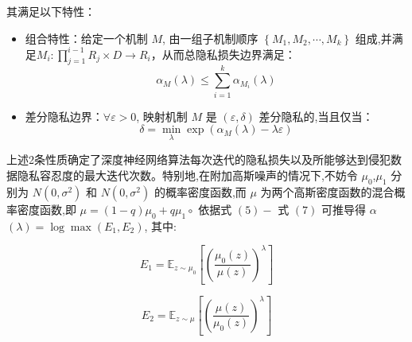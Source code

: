 其满足以下特性：

\begin{itemize}
\item 组合特性：给定一个机制 $M$, 由一组子机制顺序 $\left\{M_{1}, M_{2}, \cdots, M_{k}\right\}$ 组成,并满足$M_{i}: \prod_{j=1}^{i-1} R_{j} \times D \rightarrow R_{i}$，从而总隐私损失边界满足：
$$
\alpha_{M}(\lambda) \leqslant \sum_{i=1}^{k} \alpha_{M_{i}}(\lambda)
$$

\item 差分隐私边界：$\forall \varepsilon>0$, 映射机制 $M$ 是 $(\varepsilon, \delta)$ 差分隐私的,当且仅当：
$$
\delta=\min _{\lambda} \exp \left(\alpha_{M}(\lambda)-\lambda \varepsilon\right)
$$
\end{itemize}

上述2条性质确定了深度神经网络算法每次迭代的隐私损失以及所能够达到侵犯数据隐私容忍度的最大迭代次数。特别地,在附加高斯噪声的情况下,不妨令 $\mu_{0}$,$\mu_{1}$ 分别为 $N\left(0, \sigma^{2}\right)$ 和 $N\left(0, \sigma^{2}\right)$ 的概率密度函数,而 $\mu$ 为两个高斯密度函数的混合概率密度函数,即 $\mu=(1-q) \mu_{0}+q \mu_{1} \circ$ 依据式 $(5)-$ 式 $(7)$ 可推导得 $\alpha$ $(\lambda)=\log \max \left(E_{1}, E_{2}\right)$, 其中:

$$
E_{1}=\mathbb{E}_{z \sim \mu_{0}}\left[\left(\frac{\mu_{0}(z)}{\mu(z)}\right)^{\lambda}\right]
$$

$$
E_{2}=\mathbb{E}_{z \sim \mu}\left[\left(\frac{\mu(z)}{\mu_{0}(z)}\right)^{\lambda}\right]
$$

